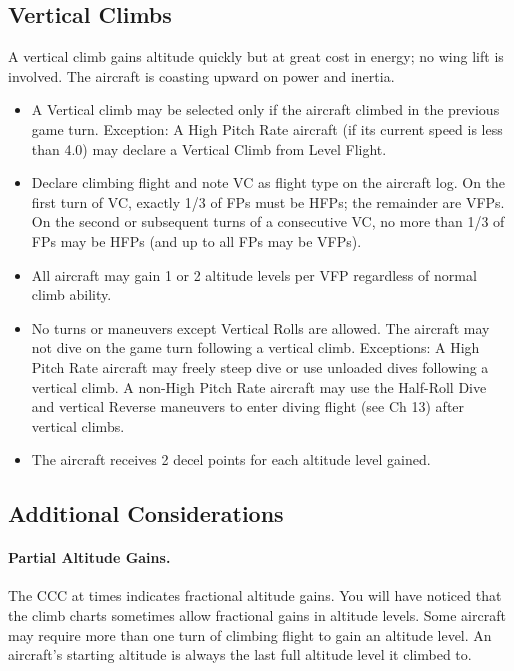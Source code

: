 \subsection{Vertical Climbs}
\label{rule:vertical-climbs}

A vertical climb gains altitude quickly but at great cost in energy; no wing lift is involved. The aircraft is coasting upward on power and inertia.

\begin{itemize}

    \item{} A Vertical climb may be selected only if the aircraft climbed in the previous game turn. Exception: A High Pitch Rate aircraft (if its current speed is less than 4.0) may declare a Vertical Climb from Level Flight.

    \item{} Declare climbing flight and note VC as flight type on the aircraft log. On the first turn of VC, exactly 1/3 of FPs must be HFPs; the remainder are VFPs. On the second or subsequent turns of a consecutive VC, no more than 1/3 of FPs may be HFPs (and up to all FPs may be VFPs).

    \item{} All aircraft may gain 1 or 2 altitude levels per VFP regardless of normal climb ability.

    \item{} No turns or maneuvers except Vertical Rolls are allowed. The aircraft may not dive on the game turn following a vertical climb. Exceptions: A High Pitch Rate aircraft may freely steep dive or use unloaded dives following a vertical climb. A non-High Pitch Rate aircraft may use the Half-Roll Dive and vertical Reverse maneuvers to enter diving flight (see Ch 13) after vertical climbs.

    \item{} The aircraft receives 2 decel points for each altitude level gained.

\end{itemize}

\subsection{Additional Considerations}

\paragraph{Partial Altitude Gains.} The CCC at times indicates fractional altitude gains. You will have noticed that the climb charts sometimes allow fractional gains in altitude levels. Some aircraft may require more than one turn of climbing flight to gain an altitude level. An aircraft's starting altitude is always the last full altitude level it climbed to. 

